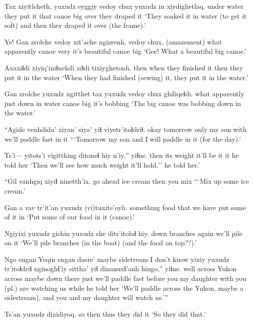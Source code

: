 \documentclass[12pt]{article}
\begin{document}
\gll Tax        xiyitlcheth,  yuxudz eyggiy vedoy chux yuxudz in   xiydighetlaq.
{under water} {they put it} {}  that    canoe big   {}    over {they draped it}
\glt `They soaked it in water (to get it soft) and then they draped it over (the frame).'
\glend

\gll Ye! Gan zrolche vedoy xit'ache ngizrenh, vedoy chux.
(amazement)   what apparently   canoe very   {it's beautiful} canoe big
\glt `Gee! What a beautiful big canoe.'
\glend

\gll Axaxiɬdi xiyiq'iniɬnekdi    xiɬdi tixiyghetonh.
then     {when they finished it} then  {they put it in the water}
\glt `When they had finished (sewing) it, they put it in the water.'
\glend

\gll Gan zrolche yuxudz ngitthet tax yuxudz vedoy chux ghiliqeɬdi. 
what apparently just       down      {in water} {}  canoe big  {it's bobbing}
\glt `The big canoe was bobbing down in the water.'
\glend

\gll ``Agide venhdida' xiyan' siya'  yiɬ  {viyetr'itoɬdriɬ}. 
okay  tomorrow  only   {my son} with {we'll paddle fast in it}
\glt ```Tomorrow my son and I will paddle in it (for the day).'
\glend

\gll Ts'i--- yitots'i vigitthing  ditoneɬ  hiy n'iy,'' yiɬne.
{} then     {its weight} {it'll be} it it {he told her}
\glt `Then we'll see how much weight it'll hold,'' he told her.'
\glend

\gll ``Gil      vanhgiq   xiyiɬ ninetth'ix.
{go ahead} {ice cream} then  {you mix}
\glt ```Mix up some ice cream.'
\glend

\gll Gan a vav  tr'it'an yuxudz (vi)tuxite'oyh.
something {} food {that we have} {}  {put some of it in}
\glt `Put some of our food in it (canoe).'
\glend

\gll Ngiyixi yuxudz gichin   yuxudz che   ditr'itolaɬ   hiy.
down    {}    branches     {}  again {we'll pile on} it
\glt `We'll pile branches (in the boat) (and the food on top??).'
\glend

\gll Ngo  engan  Yeqin engan dasre'  {maybe sidetream I don't know} yixiy      yuxudz tr'itoɬdriɬ  nginoghɬ'iy  sittha' yiɬ dinanuxɬ'anh hingo,'' yiɬne.
well across Yukon across maybe  {}  {down there} just   {we'll paddle fast} {before you} {my daughter} with {you (pl.) are watching us} while {he told her}
\glt `We'll paddle across the Yukon, maybe a sidestream), and you and my daughter will watch us.'''
\glend

\gll Ts'an   yuxudz dixidiyoq.
{so then} thus  {they did it}
\glt `So they did that.'
\glend
\end{document}
